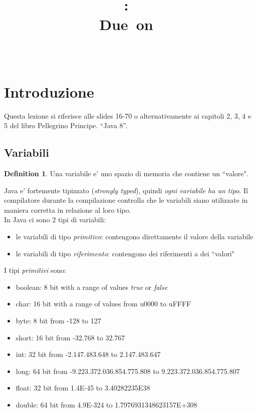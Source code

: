 \documentclass{article}
\title{
\vspace{2in}
\textmd{\textbf{\hmwkClass:\ \hmwkTitle}}\\
\normalsize\vspace{0.1in}\small{Due\ on\ \hmwkDueDate}\\
\vspace{0.1in}\large{\textit{\hmwkClassInstructor\ \hmwkClassTime}}
\vspace{3in}
}
\author{\textbf{\hmwkAuthorName}}
\date{} %
\begin{document}
\maketitle



\newpage
\tableofcontents
\newpage

\theoremstyle{definition} 

\newtheorem{mydef}{Definition}
\newtheorem{lemma}{Lemma}

\newtheorem{theorem}{Theorem}[section]


\section{Introduzione}
Questa lezione si riferisce alle slides 16-70  o alternativamente ai capitoli 2, 3, 4 e 5 del libro  Pellegrino Principe. “Java 8”.

\subsection{Variabili}
\begin{mydef} Una variabile e' uno spazio di memoria che contiene un ``valore". 
\end{mydef}
Java e' fortemente tipizzato (\emph{strongly typed}), quindi \emph{ogni variabile ha un tipo}. Il compilatore durante la compilazione controlla che le variabili siano utilizzate in maniera corretta in relazione al loro tipo.\\

In Java ci sono 2 tipi di variabili:
\begin{itemize}
\item le variabili di tipo \emph{primitivo}: contengono direttamente il valore della variabile
\item le variabili di tipo \emph{riferimento}: contengono dei riferimenti a dei ``valori"
\end{itemize}

I tipi \emph{primitivi} sono:
\begin{itemize}
\item boolean: 8 bit with a range of values \emph{true} or \emph{false}
\item char: 16 bit with a range of values from u0000 to uFFFF
\item byte: 8 bit from -128 to 127
\item short: 16 bit from -32.768 to 32.767
\item int: 32 bit from -2.147.483.648 to 2.147.483.647
\item long: 64 bit from -9.223.372.036.854.775.808 to 9.223.372.036.854.775.807
\item float: 32 bit from 1.4E-45 to 3.40282235E38
\item double: 64 bit from 4.9E-324 to 1.7976931348623157E+308
\end{itemize}
\end{document}
